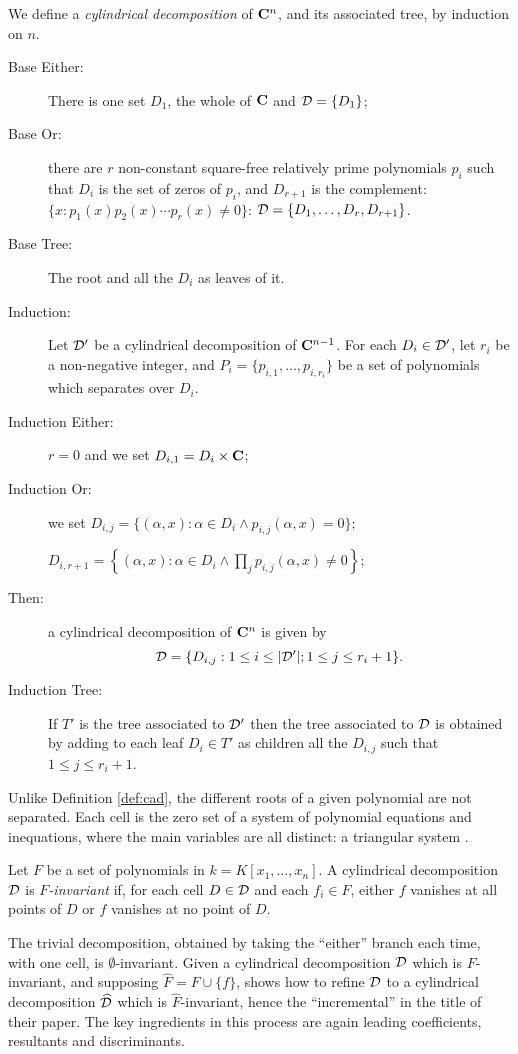 \documentclass[runningheads,a4paper]{llncs}
\begin{document}
\begin{definition}\label{def:ccd}
We define a \emph{cylindrical decomposition} of ${\mathbf C}^n$, and its associated tree, by induction on $n$.
\begin{description}
\item[Base Either:] There is one set $D_1$, the whole of ${\mathbf C}$ and ${\cal D}=\{D_1\}$;
\item[Base Or:] there are $r$ non-constant square-free relatively prime polynomials $p_i$ such that $D_i$ is the set of zeros of $p_i$, and $D_{r+1}$ is the complement: $\{x: p_1(x)p_2(x)\cdots p_r(x)\ne0\}$: ${\cal D}=\{D_1,\ldots,D_r,D_{r+1}\}$.
\item[Base Tree:] The root and all the $D_i$ as leaves of it.
\item[Induction:] Let ${\cal D}'$ be a cylindrical decomposition of ${\mathbf C}^{n-1}$. For each $D_i\in{\cal D}'$, let $r_i$ be a non-negative integer, and $P_i=\{p_{i,1},\ldots,p_{i,r_i}\}$ be a set of polynomials which separates over $D_i$. 
\item[Induction Either:] $r=0$ and we set $D_{i,1}=D_i\times{\mathbf C}$;
\item[Induction Or:] we set $D_{i,j}=\{(\alpha,x): \alpha\in D_i \land p_{i,j}(\alpha,x)=0\}$; 
\item[\qquad\quad]$D_{i,r+1}=\left\{(\alpha,x): \alpha\in D_i \land \prod_jp_{i,j}(\alpha,x)\ne0\right\}$;
\item[Then:] a cylindrical decomposition of ${\mathbf C}^n$ is given by
\[
{\cal D}=\{D_{i,j}: 1\le i\le |{\cal D}'|; 1\le j\le r_i+1\}.
\]
\item[Induction Tree:] If $T'$ is the tree associated to ${\cal D}'$ then the tree associated to ${\cal D}$ is obtained by adding to each leaf $D_i \in T'$ as children all the $D_{i,j}$ such that $1\le j\le r_i+1$.
\end{description}
\rm Unlike Definition \ref{def:cad}, the different roots of a given polynomial are not separated. Each cell is the zero set of a system of polynomial equations and inequations, where the main variables are all distinct: a triangular system \cite{Aubryetal1999}.
\end{definition}
\begin{definition}\label{def:ccd-f}Let $F$ be a set of polynomials in $k=K[x_1,\ldots,x_n]$. A cylindrical decomposition ${\cal D}$ is \emph{$F$-invariant} if, for each cell $D\in{\cal D}$ and each $f_i\in F$, either $f$ vanishes at all points of $D$ or $f$ vanishes at no point of $D$.
\end{definition}
The trivial decomposition, obtained by taking the ``either'' branch each time, with one cell, is $\emptyset$-invariant. Given a cylindrical decomposition ${\cal D}$ which is $F$-invariant, and supposing $\widehat F=F\cup \{f\}$, \cite{ChenMorenoMaza2012a} shows how to refine ${\cal D}$ to a cylindrical decomposition $\widehat{{\cal D}}$ which is $\widehat F$-invariant, hence the ``incremental'' in the title of their paper. The key ingredients in this process are again leading coefficients, resultants and discriminants. 
\end{document}
